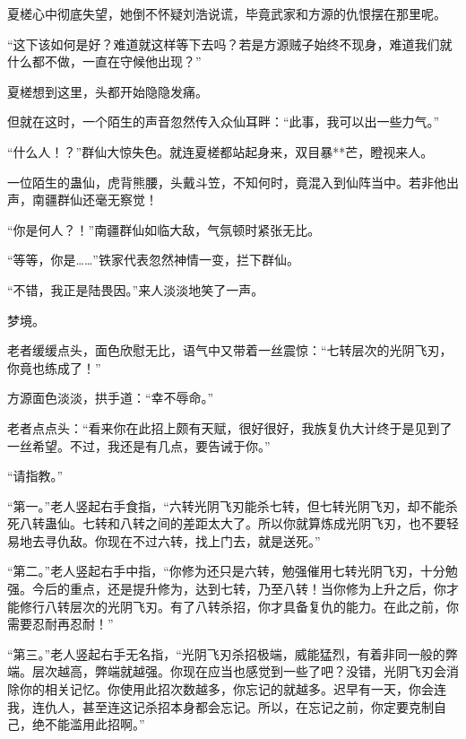 \begin{this_body}
夏槎心中彻底失望，她倒不怀疑刘浩说谎，毕竟武家和方源的仇恨摆在那里呢。

“这下该如何是好？难道就这样等下去吗？若是方源贼子始终不现身，难道我们就什么都不做，一直在守候他出现？”

夏槎想到这里，头都开始隐隐发痛。

但就在这时，一个陌生的声音忽然传入众仙耳畔：“此事，我可以出一些力气。”

“什么人！？”群仙大惊失色。就连夏槎都站起身来，双目暴**芒，瞪视来人。

一位陌生的蛊仙，虎背熊腰，头戴斗笠，不知何时，竟混入到仙阵当中。若非他出声，南疆群仙还毫无察觉！

“你是何人？！”南疆群仙如临大敌，气氛顿时紧张无比。

“等等，你是……”铁家代表忽然神情一变，拦下群仙。

“不错，我正是陆畏因。”来人淡淡地笑了一声。

梦境。

老者缓缓点头，面色欣慰无比，语气中又带着一丝震惊：“七转层次的光阴飞刃，你竟也练成了！”

方源面色淡淡，拱手道：“幸不辱命。”

老者点点头：“看来你在此招上颇有天赋，很好很好，我族复仇大计终于是见到了一丝希望。不过，我还是有几点，要告诫于你。”

“请指教。”

“第一。”老人竖起右手食指，“六转光阴飞刃能杀七转，但七转光阴飞刃，却不能杀死八转蛊仙。七转和八转之间的差距太大了。所以你就算炼成光阴飞刃，也不要轻易地去寻仇敌。你现在不过六转，找上门去，就是送死。”

“第二。”老人竖起右手中指，“你修为还只是六转，勉强催用七转光阴飞刃，十分勉强。今后的重点，还是提升修为，达到七转，乃至八转！当你修为上升之后，你才能修行八转层次的光阴飞刃。有了八转杀招，你才具备复仇的能力。在此之前，你需要忍耐再忍耐！”

“第三。”老人竖起右手无名指，“光阴飞刃杀招极端，威能猛烈，有着非同一般的弊端。层次越高，弊端就越强。你现在应当也感觉到一些了吧？没错，光阴飞刃会消除你的相关记忆。你使用此招次数越多，你忘记的就越多。迟早有一天，你会连我，连仇人，甚至连这记杀招本身都会忘记。所以，在忘记之前，你定要克制自己，绝不能滥用此招啊。”

\end{this_body}

